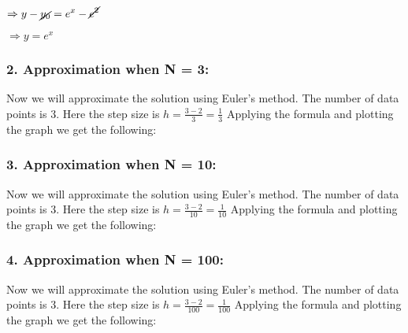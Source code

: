 \documentclass[11pt,a4paper]{amsart}
\begin{document}
\vspace{5px}
\hspace{186px} $\displaystyle \Rightarrow y - \cancel{y_0} = e^x - \cancel{e^2}$

\vspace{5px}
\hspace{185px} $\displaystyle \Rightarrow y = e^x$

\subsubsection*{2. Approximation when N = 3:} Now we will approximate the solution using Euler's method. The number of data points is 3. Here  the step size is $h = \frac{3-2}{3} = \frac{1}{3}$
Applying the formula and plotting the graph we get the following:

\subsubsection*{3. Approximation when N = 10:} Now we will approximate the solution using Euler's method. The number of data points is 3. Here  the step size is $h = \frac{3-2}{10} = \frac{1}{10}$
Applying the formula and plotting the graph we get the following:

\subsubsection*{4. Approximation when N = 100:} Now we will approximate the solution using Euler's method. The number of data points is 3. Here  the step size is $h = \frac{3-2}{100} = \frac{1}{100}$
Applying the formula and plotting the graph we get the following:
\end{document}
